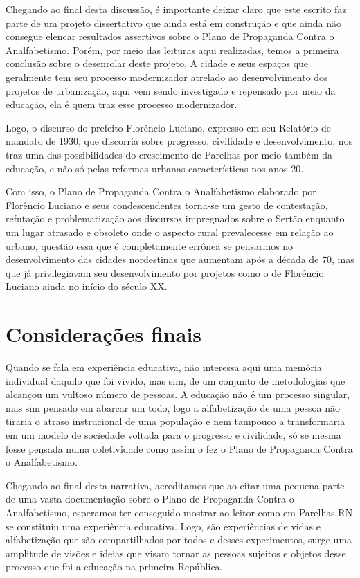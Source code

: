 \begin{refsection}
Chegando ao final desta discussão, é importante deixar claro que este escrito faz parte de um projeto dissertativo que ainda está em construção e que ainda não consegue elencar resultados assertivos sobre o Plano de Propaganda Contra o Analfabetismo. Porém, por meio das leituras aqui realizadas, temos a primeira conclusão sobre o desenrolar deste projeto. A cidade e seus espaços que geralmente tem seu processo modernizador atrelado ao desenvolvimento dos projetos de urbanização, aqui vem sendo investigado e repensado por meio da educação, ela é quem traz esse processo modernizador.  

Logo, o discurso do prefeito Florêncio Luciano, expresso em seu Relatório de mandato de 1930, que discorria sobre progresso, civilidade e desenvolvimento, nos traz uma das possibilidades do crescimento de Parelhas por meio também da educação, e não só pelas reformas urbanas características nos anos 20. 

Com isso, o Plano de Propaganda Contra o Analfabetismo elaborado por Florêncio Luciano e seus condescendentes torna-se um gesto de contestação, refutação e problematização aos discursos impregnados sobre o Sertão enquanto um lugar atrasado e obsoleto onde o aspecto rural prevalecesse em relação ao urbano, questão essa que é completamente errônea se pensarmos no desenvolvimento das cidades nordestinas que aumentam após a década de 70, mas que já privilegiavam seu desenvolvimento por projetos como o de Florêncio Luciano ainda no início do século XX.

\section{Considerações finais}

Quando se fala em experiência educativa, não interessa aqui uma memória individual daquilo que foi vivido, mas sim, de um conjunto de metodologias que alcançou um vultoso número de pessoas. A educação não é um processo singular, mas sim pensado em abarcar um todo, logo a alfabetização de uma pessoa não tiraria o atraso instrucional de uma população e nem tampouco a transformaria em um modelo de sociedade voltada para o progresso e civilidade, só se mesma fosse pensada numa coletividade como assim o fez o Plano de Propaganda Contra o Analfabetismo. 

Chegando ao final desta narrativa, acreditamos que ao citar uma pequena parte de uma vasta documentação sobre o Plano de Propaganda Contra o Analfabetismo, esperamos ter conseguido mostrar ao leitor como em Parelhas-RN se constituiu uma experiência educativa. Logo, são experiências de vidas e alfabetização que são compartilhados por todos e desses experimentos, surge uma amplitude de visões e ideias que visam tornar as pessoas sujeitos e objetos desse processo que foi a educação na primeira República.  


\end{refsection}
